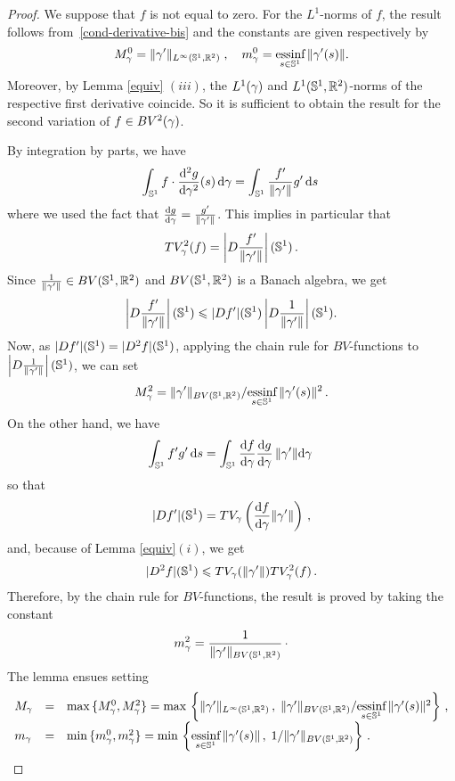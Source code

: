 \begin{proof}
We suppose that $f$ is not equal to zero. For the $L^1$-norms of $f$, the result follows from~\eqref{cond-derivative-bis} and the  constants are given respectively by 
$$M_\gamma^0 = \|\gamma'\|_{L^\infty(\mathbb{S}^1,\mathbb{R}^2)}\;, \quad m_\gamma^0=\underset{s\in\mathbb{S}^1}{\mbox{essinf}}\,\|\gamma'(s)\|.$$
Moreover, by Lemma \ref{equiv} $(iii)$, the $L^1(\gamma)$ and $L^1(\mathbb{S}^1,\mathbb{R}^2)$-norms of the respective first derivative coincide. So it is sufficient to obtain the result for the second variation  of $f \in BV^2(\gamma)$.

By integration by parts, we have
$$	
	\int_{\mathbb{S}^1} f\cdot \frac{\mathrm{d}^2 g}{\mathrm{d} \gamma^2}(s)\, \mathrm{d}\gamma = 
	\int_{\mathbb{S}^1} \frac{f'}{\|\gamma'\|}g'\, \mathrm{d} s  \,
$$
where we used the fact that $\frac{\mathrm{d} g}{\mathrm{d} \gamma}=\frac{g'}{\|\gamma'\|}$. 
This  implies in particular that 
\begin{equation}\label{Smoothness}TV^2_\gamma(f) = \left|D \frac{f'}{\|\gamma'\|}\right|(\mathbb{S}^1)\,.\end{equation}
Since $\frac{1}{\|\gamma'\|} \in BV(\mathbb{S}^1,\mathbb{R}^2)$ and $BV(\mathbb{S}^1,\mathbb{R}^2)$ is 
a Banach algebra, we get 
$$
	\left|D \frac{f'}{\|\gamma'\|}\right|(\mathbb{S}^1) \leqslant 
	|D f'|(\mathbb{S}^1) \left|D \frac{1}{\|\gamma'\|} \right|(\mathbb{S}^1).
$$ 
Now, as $|Df'|(\mathbb{S}^1) =  |D^2f|(\mathbb{S}^1)$, applying the chain rule for $BV$-functions to $\left|D \frac{1}{\|\gamma'\|}\right|(\mathbb{S}^1)$, we can set 
$$
	M_\gamma^2=   \|\gamma'\|_{BV(\mathbb{S}^1,\mathbb{R}^2)}/\underset{s\in\mathbb{S}^1}{\mbox{essinf}}\,\|\gamma'(s)\|^2\,.
$$
On the other hand, we have
$$
	\int_{\mathbb{S}^1} f'g'\, \mathrm{d} s  = 
	\int_{\mathbb{S}^1}\frac{\mathrm{d} f}{\mathrm{d} \gamma} \frac{\mathrm{d} g}{\mathrm{d} \gamma}\,\|\gamma'\| \mathrm{d}\gamma   \,
$$
so that
$$
	|D f'|(\mathbb{S}^1) = TV_\gamma\left(\frac{\mathrm{d} f}{\mathrm{d} \gamma} \|\gamma'\| \right)\,,
$$
and, because of Lemma \ref{equiv}$(i)$, we get
\begin{equation}\label{m_GA}
	|D^2 f|(\mathbb{S}^1)\leqslant TV_\gamma(\|\gamma'\|)TV^2_\gamma(f) \,.
\end{equation}
Therefore, by the chain rule for $BV$-functions, the result is proved by taking the constant
$$
m_\gamma^2= \frac{1}{\|\gamma'\|_{BV(\mathbb{S}^1,\mathbb{R}^2)}} \, \cdot
$$
The lemma ensues setting
\begin{equation}\label{equiv-down}
\begin{array}{lll}
	M_\gamma & = &\max \,\{M_\gamma^0,M_\gamma^2\}   
	=  \max \,\left\{\|\gamma'\|_{L^\infty(\mathbb{S}^1,\mathbb{R}^2)}\,,\;  
	\|\gamma'\|_{BV(\mathbb{S}^1,\mathbb{R}^2)}/\underset{s\in\mathbb{S}^1}{\mbox{essinf}}\,\|\gamma'(s)\|^2\right\}\,,\\
 m_\gamma & = & \min \,\{m_\gamma^0,m_\gamma^2\}  =  \min \,\left\{\underset{s\in\mathbb{S}^1}{\mbox{essinf}}\,\|\gamma'(s)\|\,,\;1/\|\gamma'\|_{BV(\mathbb{S}^1,\mathbb{R}^2)}\right\}\,.
 \end{array}
\end{equation}

\end{proof}

